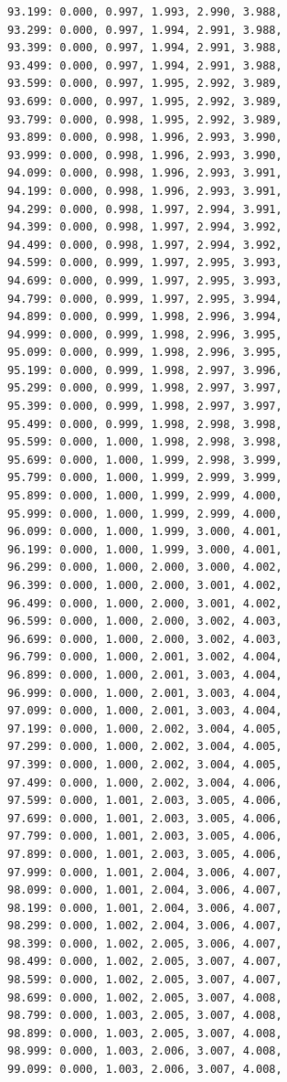 \documentclass[12pt, a4paper]{article}
\begin{document}
\begin{scriptsize}
\begin{ttfamily}
\begin{lstlisting}
93.199: 0.000, 0.997, 1.993, 2.990, 3.988, 
93.299: 0.000, 0.997, 1.994, 2.991, 3.988, 
93.399: 0.000, 0.997, 1.994, 2.991, 3.988, 
93.499: 0.000, 0.997, 1.994, 2.991, 3.988, 
93.599: 0.000, 0.997, 1.995, 2.992, 3.989, 
93.699: 0.000, 0.997, 1.995, 2.992, 3.989, 
93.799: 0.000, 0.998, 1.995, 2.992, 3.989, 
93.899: 0.000, 0.998, 1.996, 2.993, 3.990, 
93.999: 0.000, 0.998, 1.996, 2.993, 3.990, 
94.099: 0.000, 0.998, 1.996, 2.993, 3.991, 
94.199: 0.000, 0.998, 1.996, 2.993, 3.991, 
94.299: 0.000, 0.998, 1.997, 2.994, 3.991, 
94.399: 0.000, 0.998, 1.997, 2.994, 3.992, 
94.499: 0.000, 0.998, 1.997, 2.994, 3.992, 
94.599: 0.000, 0.999, 1.997, 2.995, 3.993, 
94.699: 0.000, 0.999, 1.997, 2.995, 3.993, 
94.799: 0.000, 0.999, 1.997, 2.995, 3.994, 
94.899: 0.000, 0.999, 1.998, 2.996, 3.994, 
94.999: 0.000, 0.999, 1.998, 2.996, 3.995, 
95.099: 0.000, 0.999, 1.998, 2.996, 3.995, 
95.199: 0.000, 0.999, 1.998, 2.997, 3.996, 
95.299: 0.000, 0.999, 1.998, 2.997, 3.997, 
95.399: 0.000, 0.999, 1.998, 2.997, 3.997, 
95.499: 0.000, 0.999, 1.998, 2.998, 3.998, 
95.599: 0.000, 1.000, 1.998, 2.998, 3.998, 
95.699: 0.000, 1.000, 1.999, 2.998, 3.999, 
95.799: 0.000, 1.000, 1.999, 2.999, 3.999, 
95.899: 0.000, 1.000, 1.999, 2.999, 4.000, 
95.999: 0.000, 1.000, 1.999, 2.999, 4.000, 
96.099: 0.000, 1.000, 1.999, 3.000, 4.001, 
96.199: 0.000, 1.000, 1.999, 3.000, 4.001, 
96.299: 0.000, 1.000, 2.000, 3.000, 4.002, 
96.399: 0.000, 1.000, 2.000, 3.001, 4.002, 
96.499: 0.000, 1.000, 2.000, 3.001, 4.002, 
96.599: 0.000, 1.000, 2.000, 3.002, 4.003, 
96.699: 0.000, 1.000, 2.000, 3.002, 4.003, 
96.799: 0.000, 1.000, 2.001, 3.002, 4.004, 
96.899: 0.000, 1.000, 2.001, 3.003, 4.004, 
96.999: 0.000, 1.000, 2.001, 3.003, 4.004, 
97.099: 0.000, 1.000, 2.001, 3.003, 4.004, 
97.199: 0.000, 1.000, 2.002, 3.004, 4.005, 
97.299: 0.000, 1.000, 2.002, 3.004, 4.005, 
97.399: 0.000, 1.000, 2.002, 3.004, 4.005, 
97.499: 0.000, 1.000, 2.002, 3.004, 4.006, 
97.599: 0.000, 1.001, 2.003, 3.005, 4.006, 
97.699: 0.000, 1.001, 2.003, 3.005, 4.006, 
97.799: 0.000, 1.001, 2.003, 3.005, 4.006, 
97.899: 0.000, 1.001, 2.003, 3.005, 4.006, 
97.999: 0.000, 1.001, 2.004, 3.006, 4.007, 
98.099: 0.000, 1.001, 2.004, 3.006, 4.007, 
98.199: 0.000, 1.001, 2.004, 3.006, 4.007, 
98.299: 0.000, 1.002, 2.004, 3.006, 4.007, 
98.399: 0.000, 1.002, 2.005, 3.006, 4.007, 
98.499: 0.000, 1.002, 2.005, 3.007, 4.007, 
98.599: 0.000, 1.002, 2.005, 3.007, 4.007, 
98.699: 0.000, 1.002, 2.005, 3.007, 4.008, 
98.799: 0.000, 1.003, 2.005, 3.007, 4.008, 
98.899: 0.000, 1.003, 2.005, 3.007, 4.008, 
98.999: 0.000, 1.003, 2.006, 3.007, 4.008, 
99.099: 0.000, 1.003, 2.006, 3.007, 4.008, 

\end{lstlisting}
\end{ttfamily}
\end{scriptsize}
\end{document}
